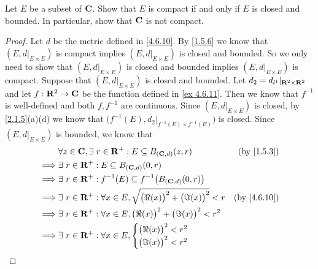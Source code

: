 \begin{exercise}\label{ex 4.6.13}
  Let \(E\) be a subset of \(\mathbf{C}\).
  Show that \(E\) is compact if and only if \(E\) is closed and bounded.
  In particular, show that \(\mathbf{C}\) is not compact.
\end{exercise}

\begin{proof}
  Let \(d\) be the metric defined in \cref{4.6.10}.
  By \cref{1.5.6} we know that \((E, d|_{E \times E})\) is compact implies \((E, d|_{E \times E})\) is closed and bounded.
  So we only need to show that \((E, d|_{E \times E})\) is closed and bounded implies \((E, d|_{E \times E})\) is compact.
  Suppose that \((E, d|_{E \times E})\) is closed and bounded.
  Let \(d_2 = d_{l^1}|_{\mathbf{R}^2 \times \mathbf{R}^2}\) and let \(f : \mathbf{R}^2 \to \mathbf{C}\) be the function defined in \cref{ex 4.6.11}.
  Then we know that \(f^{-1}\) is well-defined and both \(f, f^{-1}\) are continuous.
  Since \((E, d|_{E \times E})\) is closed, by \cref{2.1.5}(a)(d) we know that \(\big(f^{-1}(E), d_2|_{f^{-1}(E) \times f^{-1}(E)}\big)\) is closed.
  Since \((E, d|_{E \times E})\) is bounded, we know that
  \begin{align*}
             & \forall z \in \C, \exists\ r \in \R^+ : E \subseteq B_{(\C, d)}(z, r)                     & \text{(by \cref{1.5.3})}  \\
    \implies & \exists\ r \in \R^+ : E \subseteq B_{(\C, d)}(0, r)                                                                   \\
    \implies & \exists\ r \in \R^+ : f^{-1}(E) \subseteq f^{-1}\big(B_{(\C, d)}(0, r)\big)                                           \\
    \implies & \exists\ r \in \R^+ : \forall x \in E, \sqrt{\big(\Re(x)\big)^2 + \big(\Im(x)\big)^2} < r & \text{(by \cref{4.6.10})} \\
    \implies & \exists\ r \in \R^+ : \forall x \in E, \big(\Re(x)\big)^2 + \big(\Im(x)\big)^2 < r^2                                  \\
    \implies & \exists\ r \in \R^+ : \forall x \in E, \begin{cases}
                                                        \big(\Re(x)\big)^2 < r^2 \\
                                                        \big(\Im(x)\big)^2 < r^2
                                                      \end{cases}                                                       \\

\end{align*}
\end{proof}
